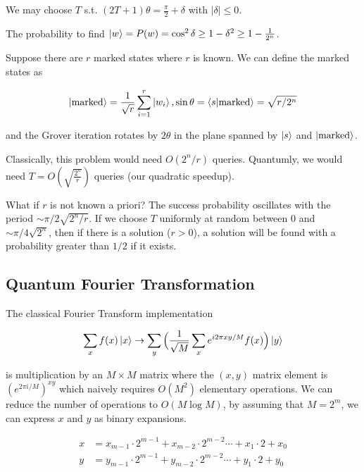 \documentclass[11pt]{article}
\begin{document}
We may choose $T$ s.t. $(2T+1)\theta = \frac{\pi}{2} + \delta$ with $|\delta| \le 0$.

The probability to find $\ket{w} = P(w) = \cos^2\delta \ge 1 - \delta^2 \ge 1 - \frac{1}{2^n}$.

Suppose there are $r$ marked states where $r$ is known. We can define the marked states as

\begin{equation*}
	\ket{\text{marked}} = \frac{1}{\sqrt{r}} \sum_{i=1}^r \ket{w_i}, \sin\theta = \braket{s | \text{marked}} = \sqrt{r/2^n}
\end{equation*}

and the Grover iteration rotates by $2\theta$ in the plane spanned by $\ket{s}$ and $\ket{\text{marked}}$.

Classically, this problem would need $O(2^n/r)$ queries. Quantumly, we would need $T = O(\sqrt{\frac{2^n}{r}})$ queries (our quadratic speedup).

What if $r$ is not known a priori? The success probability oscillates with the period $\sim \pi/2 \sqrt{2^n/r}$. If we choose $T$ uniformly at random between $0$ and $\sim \pi / 4 \sqrt{2^n}$, then if there is a solution ($r > 0$), a solution will be found with a probability greater than $1/2$ if it exists.


\subsection{Quantum Fourier Transformation}

The classical Fourier Transform implementation

\begin{equation*}
	\sum_x f(x)\ket{x} \rightarrow \sum_y \Big( \frac{1}{\sqrt{M}} \sum_x e^{i2{\pi}xy/M}f(x)\Big)\ket{y}
\end{equation*}

is multiplication by an $M \times M$ matrix where the $\left( x,y \right)$ matrix element is $\left( e^{2{\pi}i/M} \right)^{xy}$ which naively requires $O(M^2)$ elementary operations. We can reduce the number of operations to $O(M \log M)$, by assuming that $M = 2^m$, we can express $x$ and $y$ as binary expansions.

\begin{align*}
	x & = x_{m-1} \cdot 2^{m-1} + x_{m-2} \cdot 2^{m-2} \cdots + x_1 \cdot 2 + x_0 \\
	y & = y_{m-1} \cdot 2^{m-1} + y_{m-2} \cdot 2^{m-2} \cdots + y_1 \cdot 2 + y_0 \\
\end{align*}
\end{document}
